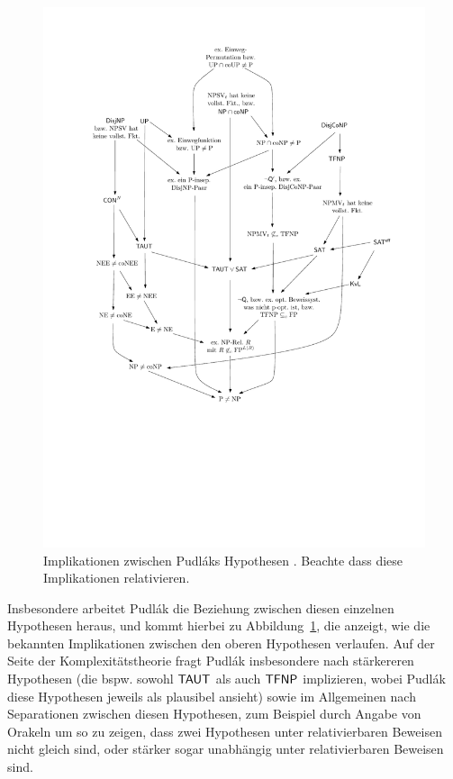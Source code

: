 \begin{figure}
    \centering\includegraphics[page=8]{figures.pdf}
    \caption{Implikationen zwischen Pudláks Hypothesen \parencite*{pudlak_incompleteness_2017}. Beachte dass diese Implikationen relativieren.}\label{fig:pudlak-small}
\end{figure}

Insbesondere arbeitet Pudlák die Beziehung zwischen diesen einzelnen Hypothesen heraus, und kommt hierbei zu Abbildung~\ref{fig:pudlak-small}, die anzeigt, wie die bekannten Implikationen zwischen den oberen Hypothesen verlaufen.
Auf der Seite der Komplexitätstheorie fragt Pudlák insbesondere nach stärkereren Hypothesen (die bspw. sowohl $\mathsf{TAUT}$ als auch $\mathsf{TFNP}$ implizieren, wobei Pudlák diese Hypothesen jeweils als plausibel ansieht) sowie im Allgemeinen nach Separationen zwischen diesen Hypothesen, zum Beispiel durch Angabe von Orakeln um so zu zeigen, dass zwei Hypothesen unter relativierbaren Beweisen nicht gleich sind, oder stärker sogar unabhängig unter relativierbaren Beweisen sind.

